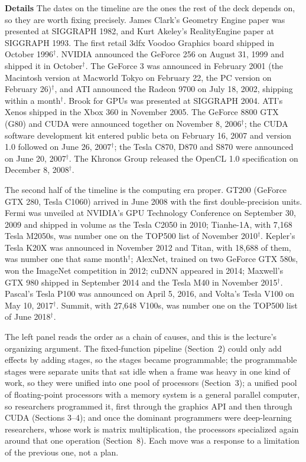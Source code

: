 \documentclass[11pt,letterpaper]{article}
\newcommand{\para}[1]{\medskip\noindent\textbf{#1}\quad}
\begin{document}
\para{Details} The dates on the timeline are the ones the rest of the deck depends on, so they are worth fixing precisely. James Clark's Geometry Engine paper was presented at SIGGRAPH 1982, and Kurt Akeley's RealityEngine paper at SIGGRAPH 1993. The first retail 3dfx Voodoo Graphics board shipped in October 1996$^\dagger$. NVIDIA announced the GeForce 256 on August 31, 1999 and shipped it in October$^\dagger$. The GeForce 3 was announced in February 2001 (the Macintosh version at Macworld Tokyo on February 22, the PC version on February 26)$^\dagger$, and ATI announced the Radeon 9700 on July 18, 2002, shipping within a month$^\dagger$. Brook for GPUs was presented at SIGGRAPH 2004. ATI's Xenos shipped in the Xbox 360 in November 2005. The GeForce 8800 GTX (G80) and CUDA were announced together on November 8, 2006$^\dagger$; the CUDA software development kit entered public beta on February 16, 2007 and version 1.0 followed on June 26, 2007$^\dagger$; the Tesla C870, D870 and S870 were announced on June 20, 2007$^\dagger$. The Khronos Group released the OpenCL 1.0 specification on December 8, 2008$^\dagger$.

The second half of the timeline is the computing era proper. GT200 (GeForce GTX 280, Tesla C1060) arrived in June 2008 with the first double-precision units. Fermi was unveiled at NVIDIA's GPU Technology Conference on September 30, 2009 and shipped in volume as the Tesla C2050 in 2010; Tianhe-1A, with 7{,}168 Tesla M2050s, was number one on the TOP500 list of November 2010$^\dagger$. Kepler's Tesla K20X was announced in November 2012 and Titan, with 18{,}688 of them, was number one that same month$^\dagger$; AlexNet, trained on two GeForce GTX 580s, won the ImageNet competition in 2012; cuDNN appeared in 2014; Maxwell's GTX 980 shipped in September 2014 and the Tesla M40 in November 2015$^\dagger$. Pascal's Tesla P100 was announced on April 5, 2016, and Volta's Tesla V100 on May 10, 2017$^\dagger$. Summit, with 27{,}648 V100s, was number one on the TOP500 list of June 2018$^\dagger$.

The left panel reads the order as a chain of causes, and this is the lecture's organizing argument. The fixed-function pipeline (Section~2) could only add effects by adding stages, so the stages became programmable; the programmable stages were separate units that sat idle when a frame was heavy in one kind of work, so they were unified into one pool of processors (Section~3); a unified pool of floating-point processors with a memory system is a general parallel computer, so researchers programmed it, first through the graphics API and then through CUDA (Sections 3--4); and once the dominant programmers were deep-learning researchers, whose work is matrix multiplication, the processors specialized again around that one operation (Section~8). Each move was a response to a limitation of the previous one, not a plan.
\end{document}
